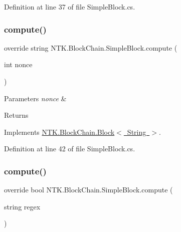 Definition at line 37 of file Simple\+Block.\+cs.

\mbox{\label{class_n_t_k_1_1_block_chain_1_1_simple_block_aa599898417786215cc2afcd9f4fc4dfe}} 
\subsubsection{\texorpdfstring{compute()}{compute()}\hspace{0.1cm}{\footnotesize\ttfamily [1/2]}}
{\footnotesize\ttfamily override string N\+T\+K.\+Block\+Chain.\+Simple\+Block.\+compute (\begin{DoxyParamCaption}\item[{int}]{nonce }\end{DoxyParamCaption})\hspace{0.3cm}{\ttfamily [virtual]}}






\begin{DoxyParams}{Parameters}
{\em nonce} & \\
\hline
\end{DoxyParams}
\begin{DoxyReturn}{Returns}

\end{DoxyReturn}


Implements \mbox{\hyperlink{class_n_t_k_1_1_block_chain_1_1_block_a69385aab04a91185ff9b5590d859b5c2}{N\+T\+K.\+Block\+Chain.\+Block$<$ String $>$}}.



Definition at line 42 of file Simple\+Block.\+cs.

\mbox{\label{class_n_t_k_1_1_block_chain_1_1_simple_block_aca95cb66b9e2cfec0e61943a814704f7}} 
\subsubsection{\texorpdfstring{compute()}{compute()}\hspace{0.1cm}{\footnotesize\ttfamily [2/2]}}
{\footnotesize\ttfamily override bool N\+T\+K.\+Block\+Chain.\+Simple\+Block.\+compute (\begin{DoxyParamCaption}\item[{string}]{regex }\end{DoxyParamCaption})}



